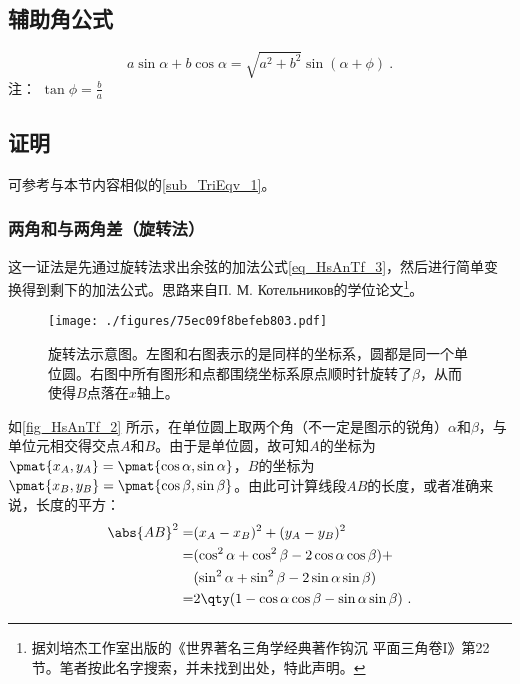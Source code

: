 \subsection{辅助角公式}
\begin{equation}\label{eq_HsAnTf_9}
a\sin\alpha + b\cos\alpha = \sqrt{a^2+b^2}\sin(\alpha + \phi)~.
\end{equation}
注： $\tan\phi = \frac{b}{a}$

\subsection{证明}

可参考与本节内容相似的\autoref{sub_TriEqv_1}。

\subsubsection{两角和与两角差（旋转法）}

这一证法是先通过旋转法求出余弦的加法公式\autoref{eq_HsAnTf_3}，然后进行简单变换得到剩下的加法公式。思路来自П. М. Котельников的学位论文\footnote{据刘培杰工作室出版的《世界著名三角学经典著作钩沉 平面三角卷I》第22节。笔者按此名字搜索，并未找到出处，特此声明。}。

\begin{figure}[ht]
\centering
\texttt{[image: ./figures/75ec09f8befeb803.pdf]}
\caption{旋转法示意图。左图和右图表示的是同样的坐标系，圆都是同一个单位圆。右图中所有图形和点都围绕坐标系原点顺时针旋转了$\beta$，从而使得$B$点落在$x$轴上。} \label{fig_HsAnTf_2}
\end{figure}


如\autoref{fig_HsAnTf_2} 所示，在单位圆上取两个角（不一定是图示的锐角）$\alpha$和$\beta$，与单位元相交得交点$A$和$B$。由于是单位圆，故可知$A$的坐标为$\pmat{x_A, y_A}=\pmat{\cos\alpha, \sin\alpha}$，$B$的坐标为$\pmat{x_B, y_B}=\pmat{\cos\beta, \sin\beta}$。由此可计算线段$AB$的长度，或者准确来说，长度的平方：
\begin{equation}\label{eq_HsAnTf_1}
\begin{aligned}
\abs{AB}^2 =& (x_A-x_B)^2+(y_A-y_B)^2\\
=& (\cos^2\alpha+\cos^2\beta-2\cos\alpha\cos\beta)+\\&(\sin^2\alpha+\sin^2\beta-2\sin\alpha\sin\beta)\\
=& 2\qty(1-\cos\alpha\cos\beta-\sin\alpha\sin\beta)~.
\end{aligned}
\end{equation}

